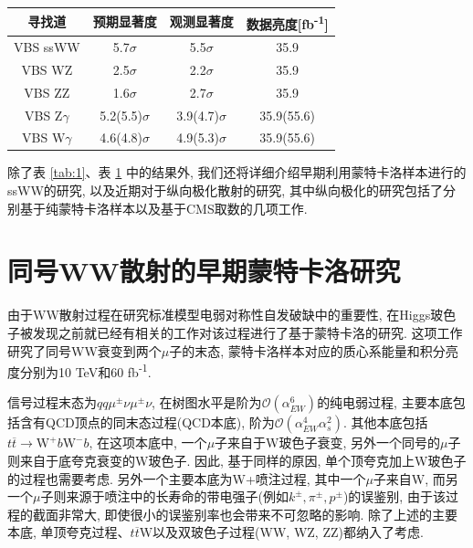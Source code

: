 \documentclass{SCIS2020cn}
\newcommand{\Wboson}{\text{W}}
\newcommand{\Zboson}{\text{Z}}
\begin{document}
\begin{table}[!t]
\label{tab:2}
\footnotesize
\tabcolsep 39pt %
\begin{tabular*}{\textwidth}{cccc}
\toprule
寻找道& 预期显著度 & 观测显著度 &
数据亮度[fb\textsuperscript{-1}] \\ \hline
VBS ssWW & 5.7$\sigma$ & 5.5$\sigma$ & 35.9\\
VBS WZ & 2.5$\sigma$ & 2.2$\sigma$ & 35.9\\
VBS ZZ & 1.6$\sigma$ & 2.7$\sigma$ & 35.9\\
VBS $\Zboson\gamma$ & 5.2(5.5)$\sigma$ & 3.9(4.7)$\sigma$ & 35.9(55.6)\\
VBS $\Wboson\gamma$ & 4.6(4.8)$\sigma$ & 4.9(5.3)$\sigma$ & 35.9(55.6)\\
\bottomrule
\end{tabular*}
\end{table}

除了表 \ref{tab:1}、表 \ref{tab:2} 中的结果外, 我们还将详细介绍早期利用蒙特卡洛样本进行的ssWW的研究, 以及近期对于纵向极化散射的研究, 其中纵向极化的研究包括了分别基于纯蒙特卡洛样本以及基于CMS取数的几项工作. 

\section{同号WW散射的早期蒙特卡洛研究}

由于WW散射过程在研究标准模型电弱对称性自发破缺中的重要性, 在Higgs玻色子被发现之前就已经有相关的工作对该过程进行了基于蒙特卡洛的研究. 这项工作研究了同号WW衰变到两个$\mu$子的末态, 蒙特卡洛样本对应的质心系能量和积分亮度分别为10 TeV和60 fb\textsuperscript{-1}. 

信号过程末态为$qq\mu^{\pm}\nu\mu^{\pm}\nu$, 在树图水平是阶为$\mathcal{O}(\alpha^6_{EW})$的纯电弱过程, 主要本底包括含有QCD顶点的同末态过程(QCD本底), 阶为$\mathcal{O}(\alpha^4_{EW}\alpha^2_s)$. 其他本底包括$t\overline{t} \rightarrow \Wboson^+b\Wboson^-b$, 在这项本底中, 一个$\mu$子来自于W玻色子衰变, 另外一个同号的$\mu$子则来自于底夸克衰变的W玻色子. 因此, 基于同样的原因, 单个顶夸克加上W玻色子的过程也需要考虑. 另外一个主要本底为W+喷注过程, 其中一个$\mu$子来自W, 而另一个$\mu$子则来源于喷注中的长寿命的带电强子(例如$k^{\pm},\pi^{\pm},p^{\pm}$)的误鉴别, 由于该过程的截面非常大, 即使很小的误鉴别率也会带来不可忽略的影响. 除了上述的主要本底, 单顶夸克过程、$t\overline{t}\Wboson$以及双玻色子过程(WW, WZ, ZZ)都纳入了考虑. 
\end{document}
